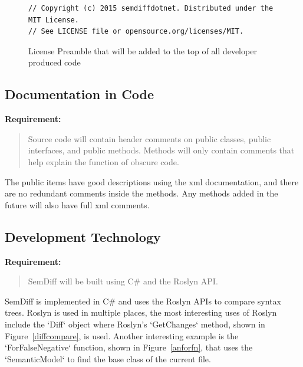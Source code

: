\documentclass[draftclsnofoot,onecolumn]{IEEEtran}
\begin{document}
\begin{figure}[!htb]
\centering
\begin{lstlisting}
// Copyright (c) 2015 semdiffdotnet. Distributed under the MIT License. 
// See LICENSE file or opensource.org/licenses/MIT.
\end{lstlisting}
\caption{License Preamble that will be added to the top of all developer 
produced code}
\label{mitheader}
\end{figure}

\subsection{Documentation in Code}%

\textbf{Requirement:}

\begin{quote}

Source code will contain header comments on public classes, public 
interfaces, and public methods. Methods will only contain comments that help 
explain the function of obscure code.

\end{quote}

The public items have good descriptions using the xml documentation, and 
there are no redundant comments inside the methods. Any methods added in the 
future will also have full xml comments.

\subsection{Development Technology}%

\textbf{Requirement:}

\begin{quote}

SemDiff will be built using C\# and the Roslyn API.

\end{quote}

SemDiff is implemented in C\# and uses the Roslyn APIs to compare syntax 
trees. Roslyn is used in multiple places, the most interesting uses of Roslyn 
include the `Diff` object where Roslyn’s `GetChanges` method, shown in 
Figure~\ref{diffcompare}, is used. Another interesting example is the 
`ForFalseNegative` function, shown in Figure~\ref{anforfn}, that uses the 
`SemanticModel` to find the base class of the current file.
\end{document}

